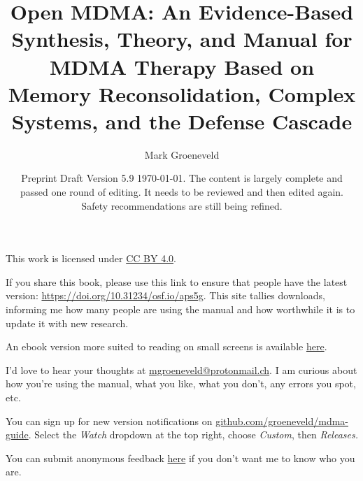 \documentclass[11pt,oneside]{book}
\begin{document}

\frontmatter

\title{Open MDMA: An Evidence-Based Synthesis, Theory, and Manual for MDMA Therapy Based on Memory Reconsolidation, Complex Systems, and the Defense Cascade}
\author{
    Mark Groeneveld
}
\date{Preprint Draft Version 5.9 \today. The content is largely complete and passed one round of editing. It needs to be reviewed and then edited again. Safety recommendations are still being refined.}

\maketitle

\begin{center}
    This work is licensed under \href{https://creativecommons.org/licenses/by/4.0/}{CC BY 4.0}.

    \vspace{\baselineskip}

    If you share this book, please use this link to ensure that people have the latest version: \href{https://doi.org/10.31234/osf.io/aps5g}{https://doi.org/10.31234/osf.io/aps5g}. This site tallies downloads, informing me how many people are using the manual and how worthwhile it is to update it with new research.

    \vspace{\baselineskip}

    An ebook version more suited to reading on small screens is available \href{https://raw.githubusercontent.com/groeneveld/mdma-guide/refs/heads/main/Open%20MDMA.epub}{here}.

    \vspace{\baselineskip}

    I'd love to hear your thoughts at \href{mailto:mgroeneveld@protonmail.ch}{mgroeneveld@protonmail.ch}. I am curious about how you're using the manual, what you like, what you don't, any errors you spot, etc.

    \vspace{\baselineskip}

    You can sign up for new version notifications on \href{https://github.com/groeneveld/mdma-guide}{github.com/groeneveld/mdma-guide}. Select the \textit{Watch} dropdown at the top right, choose \textit{Custom}, then \textit{Releases.}

    \vspace{\baselineskip}

    You can submit anonymous feedback \href{https://docs.google.com/forms/d/e/1FAIpQLScZe2h4L9PcLQGGpuerk44FXiWThRC2w6YNwSm67OXIJun-rA/viewform?usp=dialog}{here} if you don't want me to know who you are.
\end{center}
\end{document}
